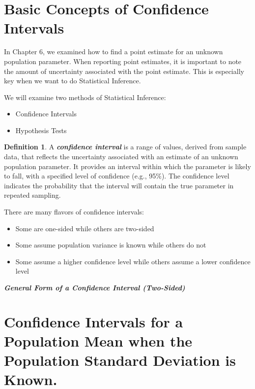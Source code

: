 \documentclass[
  11pt,
  oneside]{book}
\providecommand{\tightlist}{%
  \setlength{\itemsep}{0pt}\setlength{\parskip}{0pt}}
\theoremstyle{definition}
\newtheorem{definition}{Definition}[chapter]
\theoremstyle{definition}
\theoremstyle{definition}
\theoremstyle{definition}
\theoremstyle{remark}
\begin{document}
\section{Basic Concepts of Confidence Intervals}\label{basic-concepts-of-confidence-intervals}

In Chapter 6, we examined how to find a point estimate for an unknown population parameter. When reporting point estimates, it is important to note the amount of uncertainty associated with the point estimate. This is especially key when we want to do Statistical Inference.

We will examine two methods of Statistical Inference:

\begin{itemize}
\item
  Confidence Intervals
\item
  Hypothesis Tests
\end{itemize}

\begin{definition}
A \textbf{\emph{confidence interval}} is a range of values, derived from sample data, that reflects the uncertainty associated with an estimate of an unknown population parameter. It provides an interval within which the parameter is likely to fall, with a specified level of confidence (e.g., 95\%). The confidence level indicates the probability that the interval will contain the true parameter in repeated sampling.
\end{definition}

There are many flavors of confidence intervals:

\begin{itemize}
\tightlist
\item
  Some are one-sided while others are two-sided
\item
  Some assume population variance is known while others do not
\item
  Some assume a higher confidence level while others assume a lower confidence level
\end{itemize}

\newpage

\textbf{\emph{General Form of a Confidence Interval (Two-Sided)}}

\vspace{6cm}

\section{Confidence Intervals for a Population Mean when the Population Standard Deviation is Known.}\label{confidence-intervals-for-a-population-mean-when-the-population-standard-deviation-is-known.}
\end{document}
